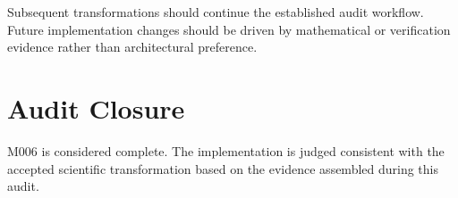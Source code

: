 Subsequent transformations should continue the established audit workflow.
Future implementation changes should be driven by mathematical or verification
evidence rather than architectural preference.

\section{Audit Closure}

M006 is considered complete. The implementation is judged consistent with the
accepted scientific transformation based on the evidence assembled during this
audit.

